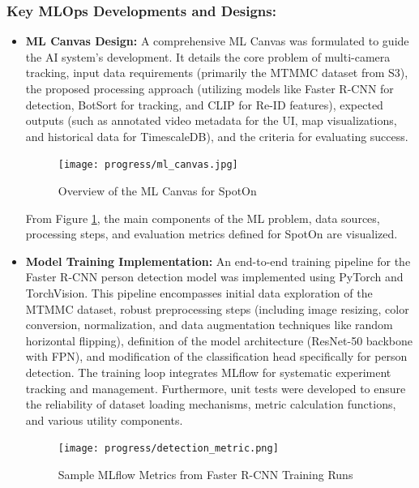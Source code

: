 \subsubsection*{Key MLOps Developments and Designs:}
\begin{itemize}
    \item \textbf{ML Canvas Design:} A comprehensive ML Canvas was formulated to guide the AI system's development. It details the core problem of multi-camera tracking, input data requirements (primarily the MTMMC dataset from S3), the proposed processing approach (utilizing models like Faster R-CNN for detection, BotSort for tracking, and CLIP for Re-ID features), expected outputs (such as annotated video metadata for the UI, map visualizations, and historical data for TimescaleDB), and the criteria for evaluating success.
    
    \begin{figure}[!htb]
        \centering
        \texttt{[image: progress/ml\_canvas.jpg]}
        \caption{Overview of the ML Canvas for SpotOn}
        \label{fig:progress_ml_canvas}
    \end{figure}
    
    From Figure \ref{fig:progress_ml_canvas}, the main components of the ML problem, data sources, processing steps, and evaluation metrics defined for SpotOn are visualized.

    \item \textbf{Model Training Implementation:} An end-to-end training pipeline for the Faster R-CNN person detection model was implemented using PyTorch and TorchVision. This pipeline encompasses initial data exploration of the MTMMC dataset, robust preprocessing steps (including image resizing, color conversion, normalization, and data augmentation techniques like random horizontal flipping), definition of the model architecture (ResNet-50 backbone with FPN), and modification of the classification head specifically for person detection. The training loop integrates MLflow for systematic experiment tracking and management. Furthermore, unit tests were developed to ensure the reliability of dataset loading mechanisms, metric calculation functions, and various utility components.
    \clearpage
    \begin{figure}[!htb]
        \centering
        \texttt{[image: progress/detection\_metric.png]}
        \caption{Sample MLflow Metrics from Faster R-CNN Training Runs}
        \label{fig:progress_mlflow_training_metrics}
    \end{figure}
    

\end{itemize}
